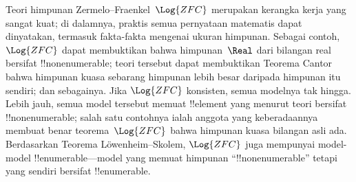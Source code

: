 \documentclass[../../../include/open-logic-section]{subfiles}
\begin{document}
\begin{ex}
Teori himpunan Zermelo--Fraenkel~$\Log{ZFC}$ merupakan kerangka kerja yang
sangat kuat; di dalamnya, praktis semua pernyataan matematis dapat
dinyatakan, termasuk fakta-fakta mengenai ukuran himpunan. Sebagai
contoh, $\Log{ZFC}$ dapat membuktikan bahwa himpunan~$\Real$ dari bilangan
real bersifat !!{nonenumerable}; teori tersebut dapat membuktikan Teorema
Cantor bahwa himpunan kuasa sebarang himpunan lebih besar daripada
himpunan itu sendiri; dan sebagainya. Jika $\Log{ZFC}$ konsisten, semua
modelnya tak hingga. Lebih jauh, semua model tersebut memuat !!{element}
yang menurut teori bersifat !!{nonenumerable}; salah satu contohnya ialah
anggota yang keberadaannya membuat benar teorema~$\Log{ZFC}$ bahwa
himpunan kuasa bilangan asli ada. Berdasarkan Teorema
L\"owenheim--Skolem, $\Log{ZFC}$
juga mempunyai model-model !!{enumerable}---model yang memuat himpunan
``!!{nonenumerable}'' tetapi yang sendiri bersifat !!{enumerable}.
\end{ex}
\end{document}
